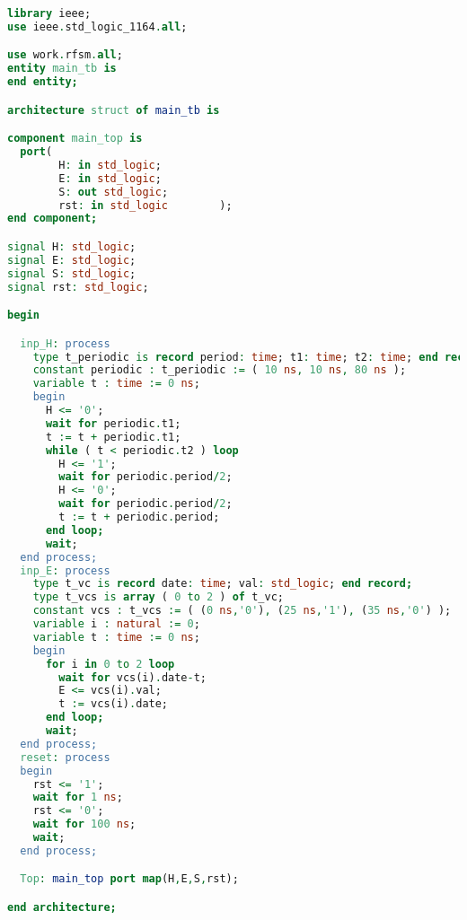 \begin{lstlisting}[language=VHDL,frame=single,numbers=none,basicstyle=\small,caption=File main_tb.vhd]
library ieee;
use ieee.std_logic_1164.all;	   

use work.rfsm.all;
entity main_tb is
end entity;

architecture struct of main_tb is

component main_top is
  port(
        H: in std_logic;
        E: in std_logic;
        S: out std_logic;
        rst: in std_logic        );
end component;

signal H: std_logic;
signal E: std_logic;
signal S: std_logic;
signal rst: std_logic;

begin

  inp_H: process
    type t_periodic is record period: time; t1: time; t2: time; end record;
    constant periodic : t_periodic := ( 10 ns, 10 ns, 80 ns );
    variable t : time := 0 ns;
    begin
      H <= '0';
      wait for periodic.t1;
      t := t + periodic.t1;
      while ( t < periodic.t2 ) loop
        H <= '1';
        wait for periodic.period/2;
        H <= '0';
        wait for periodic.period/2;
        t := t + periodic.period;
      end loop;
      wait;
  end process;
  inp_E: process
    type t_vc is record date: time; val: std_logic; end record;
    type t_vcs is array ( 0 to 2 ) of t_vc;
    constant vcs : t_vcs := ( (0 ns,'0'), (25 ns,'1'), (35 ns,'0') );
    variable i : natural := 0;
    variable t : time := 0 ns;
    begin
      for i in 0 to 2 loop
        wait for vcs(i).date-t;
        E <= vcs(i).val;
        t := vcs(i).date;
      end loop;
      wait;
  end process;
  reset: process
  begin
    rst <= '1';
    wait for 1 ns;
    rst <= '0';
    wait for 100 ns;
    wait;
  end process;

  Top: main_top port map(H,E,S,rst);

end architecture;

\end{lstlisting}

